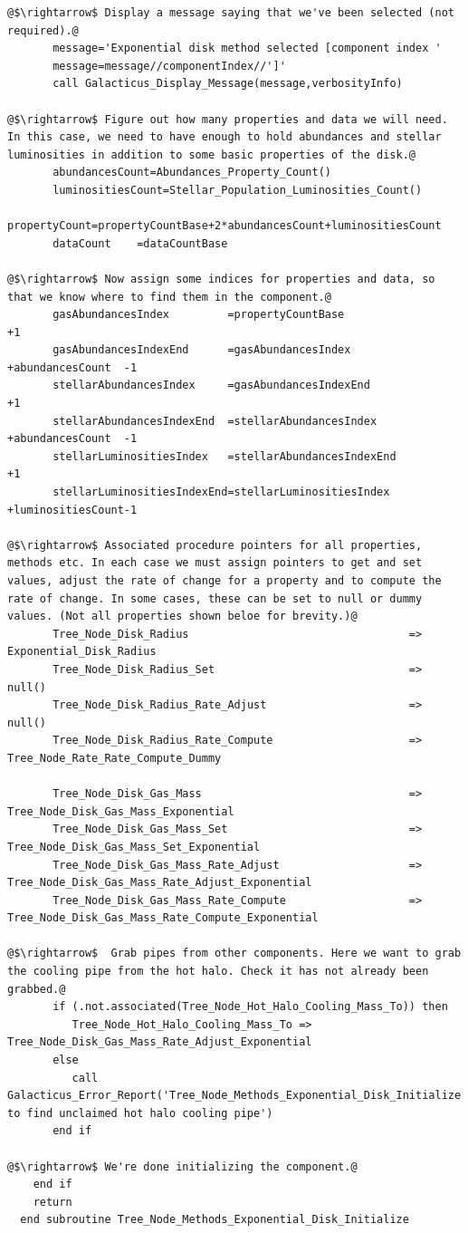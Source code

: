 \begin{lstlisting}[escapechar=@,breaklines,prebreak=\&,postbreak=\&]
@$\rightarrow$ Display a message saying that we've been selected (not required).@
       message='Exponential disk method selected [component index '
       message=message//componentIndex//']'
       call Galacticus_Display_Message(message,verbosityInfo)

@$\rightarrow$ Figure out how many properties and data we will need. In this case, we need to have enough to hold abundances and stellar luminosities in addition to some basic properties of the disk.@
       abundancesCount=Abundances_Property_Count()
       luminositiesCount=Stellar_Population_Luminosities_Count()
       propertyCount=propertyCountBase+2*abundancesCount+luminositiesCount
       dataCount    =dataCountBase

@$\rightarrow$ Now assign some indices for properties and data, so that we know where to find them in the component.@
       gasAbundancesIndex         =propertyCountBase                          +1
       gasAbundancesIndexEnd      =gasAbundancesIndex       +abundancesCount  -1
       stellarAbundancesIndex     =gasAbundancesIndexEnd                      +1
       stellarAbundancesIndexEnd  =stellarAbundancesIndex   +abundancesCount  -1
       stellarLuminositiesIndex   =stellarAbundancesIndexEnd                  +1
       stellarLuminositiesIndexEnd=stellarLuminositiesIndex +luminositiesCount-1

@$\rightarrow$ Associated procedure pointers for all properties, methods etc. In each case we must assign pointers to get and set values, adjust the rate of change for a property and to compute the rate of change. In some cases, these can be set to null or dummy values. (Not all properties shown beloe for brevity.)@
       Tree_Node_Disk_Radius                                  => Exponential_Disk_Radius
       Tree_Node_Disk_Radius_Set                              => null()
       Tree_Node_Disk_Radius_Rate_Adjust                      => null()
       Tree_Node_Disk_Radius_Rate_Compute                     => Tree_Node_Rate_Rate_Compute_Dummy

       Tree_Node_Disk_Gas_Mass                                => Tree_Node_Disk_Gas_Mass_Exponential
       Tree_Node_Disk_Gas_Mass_Set                            => Tree_Node_Disk_Gas_Mass_Set_Exponential
       Tree_Node_Disk_Gas_Mass_Rate_Adjust                    => Tree_Node_Disk_Gas_Mass_Rate_Adjust_Exponential
       Tree_Node_Disk_Gas_Mass_Rate_Compute                   => Tree_Node_Disk_Gas_Mass_Rate_Compute_Exponential

@$\rightarrow$  Grab pipes from other components. Here we want to grab the cooling pipe from the hot halo. Check it has not already been grabbed.@
       if (.not.associated(Tree_Node_Hot_Halo_Cooling_Mass_To)) then
          Tree_Node_Hot_Halo_Cooling_Mass_To => Tree_Node_Disk_Gas_Mass_Rate_Adjust_Exponential
       else
          call Galacticus_Error_Report('Tree_Node_Methods_Exponential_Disk_Initialize','expected to find unclaimed hot halo cooling pipe')
       end if

@$\rightarrow$ We're done initializing the component.@
    end if
    return
  end subroutine Tree_Node_Methods_Exponential_Disk_Initialize
\end{lstlisting}

